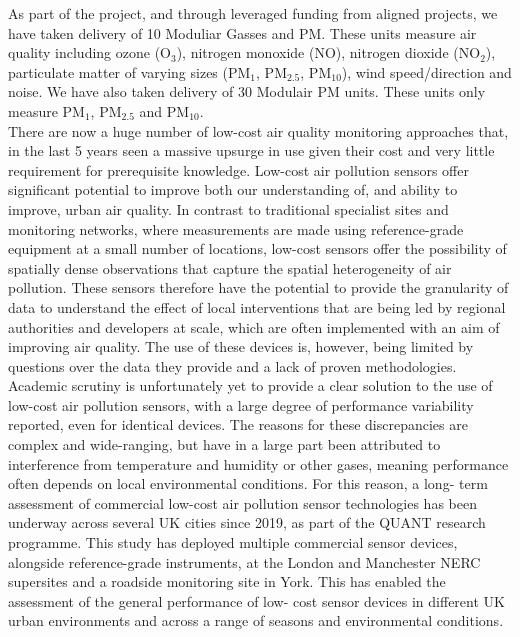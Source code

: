 \documentclass{article}
\begin{document}
\noindent As part of the project, and through leveraged funding from aligned projects, we have taken delivery of 10 Moduliar Gasses and PM. These units measure air quality including ozone (O$_3$), nitrogen monoxide (NO), nitrogen dioxide (NO$_{2}$), particulate matter of varying sizes (PM$_{1}$, PM$_{2.5}$, PM$_{10}$), wind speed/direction and noise. We have also taken delivery of 30 Modulair PM units. These units only measure PM$_{1}$, PM$_{2.5}$ and PM$_{10}$. \\

\noindent There are now a huge number of low-cost air quality monitoring approaches that, in the last 5 years seen a massive upsurge in use given their cost and very little requirement for prerequisite knowledge. Low-cost air pollution sensors offer significant potential to improve both our understanding of, and ability to improve, urban air quality. In contrast to traditional specialist sites and monitoring networks, where measurements are made using reference-grade equipment at a small number of locations, low-cost sensors offer the possibility of spatially dense observations that capture the spatial heterogeneity of air pollution. These sensors therefore have the potential to provide the granularity of data to understand the effect of local interventions that are being led by regional authorities and developers at scale, which are often implemented with an aim of improving air quality. The use of these devices is, however, being limited by questions over the data they provide and a lack of proven methodologies. \\

\noindent Academic scrutiny is unfortunately yet to provide a clear solution to the use of low-cost air pollution sensors, with a large degree of performance variability reported, even for identical devices. The reasons for these discrepancies are complex and wide-ranging, but have in a large part been attributed to interference from temperature and humidity or other gases, meaning performance often depends on local environmental conditions. For this reason, a long- term assessment of commercial low-cost air pollution sensor technologies has been underway across several UK cities since 2019, as part of the QUANT research programme. This study has deployed multiple commercial sensor devices, alongside reference-grade instruments, at the London and Manchester NERC supersites and a roadside monitoring site in York. This has enabled the assessment of the general performance of low- cost sensor devices in different UK urban environments and across a range of seasons and environmental conditions. \\
\end{document}
